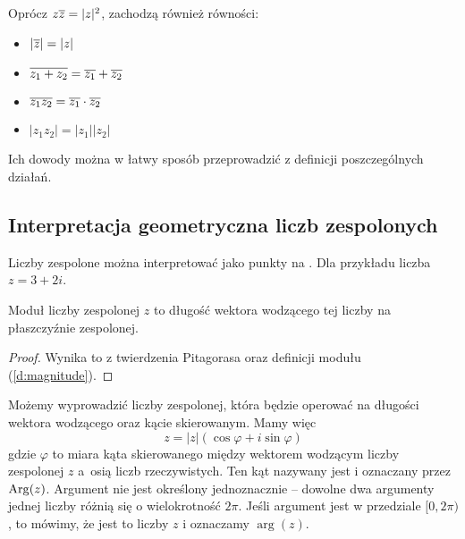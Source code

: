 \begin{lemma}
    Oprócz $z\overline{z} = |z|^2$, zachodzą również równości:
    \begin{itemize}
        \item $|\overline{z}| = |z|$
        \item $\overline{z_1 + z_2} = \overline{z_1} + \overline{z_2}$
        \item $\overline{z_1z_2} = \overline{z_1}\cdot\overline{z_2}$
        \item $|z_1z_2| = |z_1||z_2|$
    \end{itemize}
\end{lemma}
Ich dowody można w łatwy sposób przeprowadzić z definicji poszczególnych działań.

\subsection{Interpretacja geometryczna liczb zespolonych}
Liczby zespolone można interpretować jako punkty na . Dla przykładu liczba $z = 3 + 2i$.

\begin{center}
\end{center}

\begin{fact}
    Moduł liczby zespolonej $z$ to długość wektora wodzącego tej liczby na płaszczyźnie zespolonej.
\end{fact}
\begin{proof}
    Wynika to z twierdzenia Pitagorasa oraz definicji modułu (\ref{d:magnitude}).
\end{proof}

Możemy wyprowadzić  liczby zespolonej, która będzie operować na długości wektora wodzącego oraz kącie skierowanym. Mamy więc
$$ z = |z|(\cos\varphi + i\sin\varphi) $$
gdzie $\varphi$ to miara kąta skierowanego między wektorem wodzącym liczby zespolonej $z$ a~osią liczb rzeczywistych. Ten kąt nazywany jest  i oznaczany przez $\operatorname{Arg}(z)$. Argument nie jest określony jednoznacznie -- dowolne dwa argumenty jednej liczby różnią się o wielokrotność $2\pi$. Jeśli argument jest w przedziale $[0, 2\pi)$, to mówimy, że jest to  liczby $z$ i oznaczamy $\arg(z)$.

